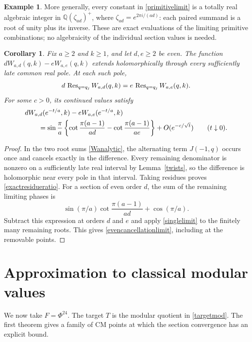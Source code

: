 \documentclass[11pt]{amsart}
\newtheorem{corollary}[theorem]{Corollary}
\theoremstyle{definition}
\newtheorem{example}[theorem]{Example}
\theoremstyle{remark}
\numberwithin{equation}{section}
\newcommand{\Q}{\mathbb Q}\newcommand{\Z}{\mathbb Z}\newcommand{\C}{\mathbb C}
\begin{document}
\begin{example}
More generally, every constant in \eqref{primitivelimit} is a totally
real algebraic integer in $\Q(\zeta_{ad})^+$, where
$\zeta_{ad}=e^{2\pi i/(ad)}$: each paired summand is a root of unity
plus its inverse. These are exact evaluations of the limiting primitive
combinations; no algebraicity of the individual section values is needed.
\end{example}

\begin{corollary}\label{evencancellation}
Fix $a\ge2$ and $k\ge1$, and let $d,e\ge2$ be even. The function
$dW_{a,d}(q,k)-eW_{a,e}(q,k)$ extends holomorphically through every
sufficiently late common real pole. At each such pole,
\begin{equation}\label{exactresidueratio}
 d\,\operatorname{Res}_{q=q_j}W_{a,d}(q,k)
 =e\,\operatorname{Res}_{q=q_j}W_{a,e}(q,k).
\end{equation}
For some $c>0$, its continued values satisfy
\begin{align}\label{evencancellationlimit}
 &dW_{a,d}(e^{-t/a},k)-eW_{a,e}(e^{-t/a},k)\notag\\
 &\qquad=\sin\frac\pi a
   \left\{\cot\frac{\pi(a-1)}{ad}
          -\cot\frac{\pi(a-1)}{ae}\right\}
      +O(e^{-c/\sqrt t})
 \qquad(t\downarrow0).
\end{align}
\end{corollary}
\begin{proof}
In the two root sums \eqref{Wanalytic}, the alternating term $J(-1,q)$
occurs once and cancels exactly in the difference. Every remaining
denominator is nonzero on a sufficiently late real interval by
Lemma~\ref{twists}, so the difference is holomorphic near every pole in
that interval. Taking residues proves \eqref{exactresidueratio}.
For a section of even order $d$, the sum of the remaining limiting
phases is
\[
 \sin(\pi/a)\cot\frac{\pi(a-1)}{ad}+\cos(\pi/a).
\]
Subtract this expression at orders $d$ and $e$ and apply
\eqref{singlelimit} to the finitely many remaining roots. This gives
\eqref{evencancellationlimit}, including at the removable points.
\end{proof}

\section{Approximation to classical modular values}
We now take $F=\Phi^{24}$. The target $T$ is the modular quotient in \eqref{targetmod}. The first theorem gives a family of CM points at which the section convergence has an explicit bound.
\end{document}
